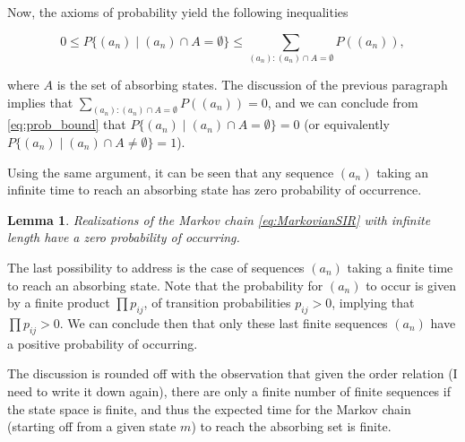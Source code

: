 \documentclass[a4paper,preprint]{elsarticle}
\newtheorem{lemma}{Lemma}
\begin{document}
Now, the axioms of probability yield the following inequalities

\begin{equation}
\label{eq:prob_bound}
 0\leq P\{(a_n) \mid (a_n) \cap A=\emptyset \}\leq \sum_{(a_n):(a_n) \cap A=\emptyset} P((a_n)),   
\end{equation}


\noindent
where $A$ is the set of absorbing states. The discussion of the previous paragraph implies that $\sum_{(a_n):(a_n) \cap A=\emptyset} P((a_n))=0$, and we can conclude from \eqref{eq:prob_bound} that $P\{(a_n) \mid (a_n) \cap A=\emptyset \}=0$ (or equivalently $P\{(a_n) \mid (a_n) \cap A \neq \emptyset \}=1$). 

Using the same argument, it can be seen that any sequence $(a_n)$ taking an infinite time to reach an absorbing state has zero probability of occurrence. 

\begin{lemma}\label{lem:zero_infty}
    Realizations of the Markov chain \eqref{eq:MarkovianSIR} with infinite length have a zero probability of occurring. 
    
\end{lemma}




The last possibility to address is the case of sequences $(a_n)$ taking a finite time to reach an absorbing state. Note that the probability for $(a_n)$ to occur is given by a finite product $\prod p_ {ij}$, of transition probabilities $p_ {ij}>0$, implying that $\prod p_ {ij}>0$. We can conclude then that only these last finite sequences $(a_n)$ have a positive probability of occurring. 

The discussion is rounded off with the observation that given the order relation (I need to write it down again), there are only a finite number of finite sequences if the state space is finite, and thus the expected time for the Markov chain (starting off from a given state $m$) to reach the absorbing set is finite.  
\end{document}
